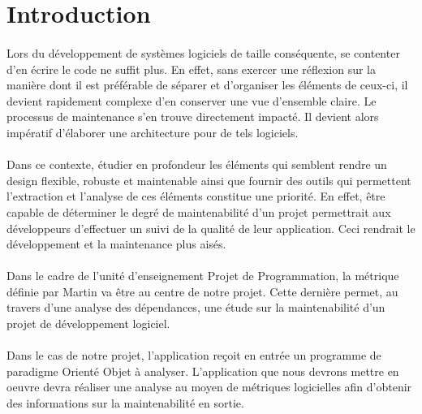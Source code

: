 \documentclass{scrartcl}
\begin{document}

\section{Introduction}
    
    \paragraph{}Lors du développement de systèmes logiciels de taille conséquente, se contenter d'en écrire le code ne suffit plus. En effet, sans exercer une réflexion sur la manière dont il est préférable de séparer et d'organiser les éléments de ceux-ci, il devient rapidement complexe d'en conserver une vue d'ensemble claire. Le processus de maintenance s'en trouve directement impacté. Il devient alors impératif d'élaborer une architecture pour de tels logiciels.


    \paragraph{}Dans ce contexte, étudier en profondeur les éléments qui semblent rendre un design flexible, robuste et maintenable ainsi que fournir des outils qui permettent l'extraction et l'analyse de ces éléments constitue une priorité. En effet, être capable de déterminer le degré de maintenabilité d'un projet permettrait aux développeurs d'effectuer un suivi de la qualité de leur application. Ceci rendrait le développement et la maintenance plus aisés.

    \paragraph{}Dans le cadre de l'unité d'enseignement \og Projet de Programmation\fg, la métrique définie par Martin\cite{Martin:1994} va être au centre de notre projet. Cette dernière permet, au travers d'une analyse des dépendances, une étude sur la maintenabilité d'un projet de développement logiciel.

    \paragraph{}Dans le cas de notre projet, l'application reçoit en entrée un programme de paradigme Orienté Objet à analyser. L'application que nous devrons mettre en oeuvre devra réaliser une analyse au moyen de métriques logicielles afin d'obtenir des informations sur la maintenabilité en sortie.
\end{document}
